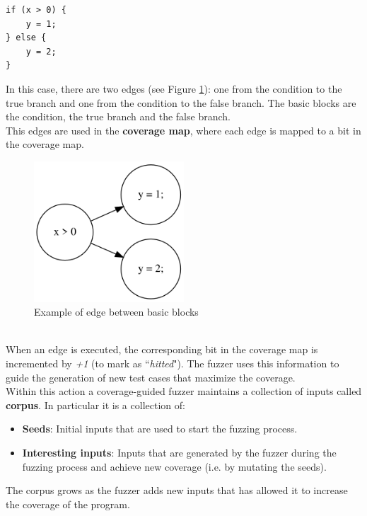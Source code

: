 \begin{lstlisting}
if (x > 0) {
    y = 1;
} else {
    y = 2;
}
\end{lstlisting}
In this case, there are two edges (see Figure \ref{fig:sample_edge_graph}): one from the condition to the true branch and one from the condition to the false branch. The basic blocks are the condition, the true branch and the false branch.
\\This edges are used in the \textbf{coverage map}, where each edge is mapped to a bit in the coverage map.
\begin{figure}[H]
    \centering
    \includegraphics[width=0.5\textwidth]{Images/sample_edge_graph.png}
    \caption{Example of edge between basic blocks}
    \label{fig:sample_edge_graph}
\end{figure}
\phantom{}\\
When an edge is executed, the corresponding bit in the coverage map is incremented by \textit{+1} (to mark as ``\textit{hitted}"). The fuzzer uses this information to guide the generation of new test cases that maximize the coverage.
\\Within this action a coverage-guided fuzzer maintains a collection of inputs called \textbf{corpus}. In particular it is a collection of:
\begin{itemize}
    \item \textbf{Seeds}: Initial inputs that are used to start the fuzzing process.
    \item \textbf{Interesting inputs}: Inputs that are generated by the fuzzer during the fuzzing process and achieve new coverage (i.e. by mutating the seeds).
\end{itemize}
The corpus grows as the fuzzer adds new inputs that has allowed it to increase the coverage of the program.

